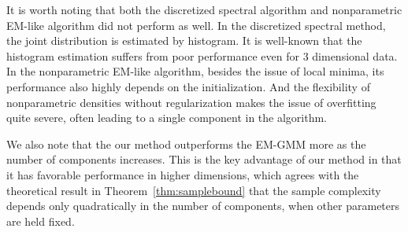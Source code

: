 \documentclass{article}
\begin{document}
It is worth noting that both the discretized spectral algorithm and nonparametric EM-like algorithm did not perform as well. In the discretized spectral method, the joint distribution is estimated by histogram. It is well-known that the histogram estimation suffers from poor performance even for 3 dimensional data. In the nonparametric EM-like algorithm, besides the issue of local minima, its performance also highly depends on the initialization. And the flexibility of nonparametric densities without regularization makes the issue of overfitting quite severe, often leading to a single component in the algorithm.

We also note that the our method outperforms the EM-GMM more as the number of components increases.
This is the key advantage of our method in that it has favorable performance in higher dimensions, which agrees with the theoretical result in Theorem~\ref{thm:samplebound} that the sample complexity depends only quadratically in the number of components, when other parameters are held fixed.

\end{document}
